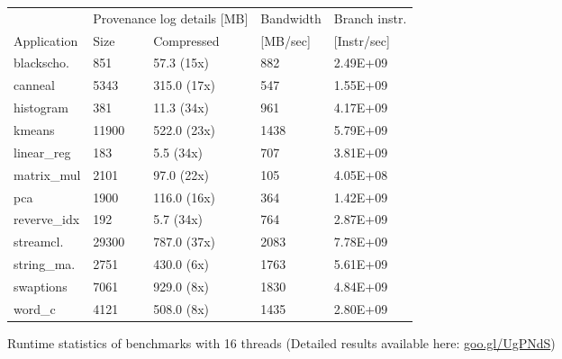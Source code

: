 \begin{figure}[t]
\centering
\myfontsize
{
\begin{tabular}{m{1cm}|m{1cm}|m{1.4cm}|m{1.25cm}|m{1.25cm}}
       & \multicolumn{2}{c|}{ Provenance log details [MB] }   &  Bandwidth & Branch instr. \\
   { Application} & Size & Compressed & [MB/sec] &  [Instr/sec] \\
  \hline \hline
    blackscho.& 851& 57.3 (15x)& 882& 2.49E+09 \\
    canneal& 5343& 315.0 (17x)& 547& 1.55E+09 \\
    histogram& 381& 11.3 (34x)& 961& 4.17E+09 \\
    kmeans& 11900& 522.0 (23x)& 1438& 5.79E+09 \\
    linear\_reg& 183& 5.5 (34x)& 707& 3.81E+09 \\
    matrix\_mul& 2101& 97.0 (22x)& 105& 4.05E+08 \\
    pca& 1900& 116.0 (16x)& 364& 1.42E+09 \\
    reverve\_idx& 192& 5.7 (34x)& 764& 2.87E+09 \\
    streamcl.& 29300& 787.0 (37x)& 2083& 7.78E+09 \\
    string\_ma.& 2751& 430.0 (6x)& 1763& 5.61E+09 \\
    swaptions& 7061& 929.0 (8x)& 1830& 4.84E+09 \\
    word\_c& 4121& 508.0 (8x)& 1435& 2.80E+09 \\

\hline
\end{tabular}
}

\caption{Runtime statistics of benchmarks with 16 threads (Detailed results available here: \href{https://goo.gl/UgPNdS}{goo.gl/UgPNdS}) }                                                                                                                                      \label{tab:apps}
\end{figure}
